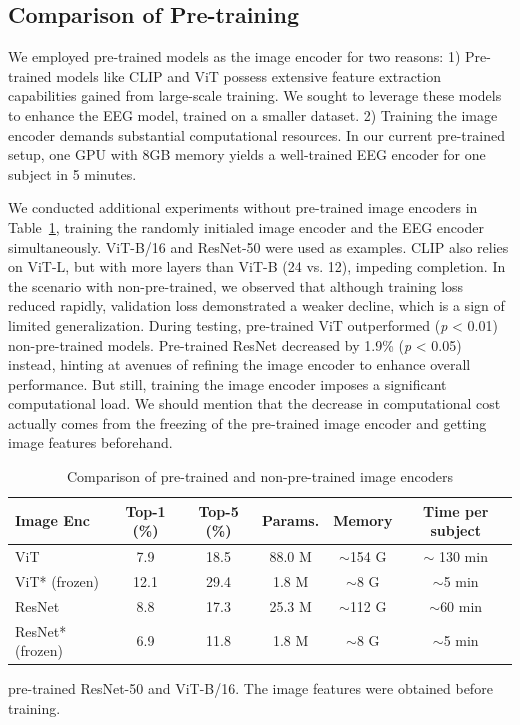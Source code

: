 \subsection{Comparison of Pre-training}
\label{sec:appendA2}
We employed pre-trained models as the image encoder for two reasons: 
1) Pre-trained models like CLIP and ViT possess extensive feature extraction capabilities gained from large-scale training. 
We sought to leverage these models to enhance the EEG model, trained on a smaller dataset. 
2) Training the image encoder demands substantial computational resources. 
In our current pre-trained setup, one GPU with 8GB memory yields a well-trained EEG encoder for one subject in 5 minutes.

We conducted additional experiments without pre-trained image encoders in Table~\ref{tab:6}, training the randomly initialed image encoder and the EEG encoder simultaneously.
ViT-B/16 and ResNet-50 were used as examples. 
CLIP also relies on ViT-L, but with more layers than ViT-B (24 vs. 12), impeding completion. 
In the scenario with non-pre-trained, we observed that although training loss reduced rapidly, validation loss demonstrated a weaker decline, which is a sign of limited generalization. 
During testing, pre-trained ViT outperformed (\textit{p} < 0.01) non-pre-trained models. 
Pre-trained ResNet decreased by 1.9\% (\textit{p} < 0.05) instead, hinting at avenues of refining the image encoder to enhance overall performance.
But still, training the image encoder imposes a significant computational load. 
We should mention that the decrease in computational cost actually comes from the freezing of the pre-trained image encoder and getting image features beforehand. 


\begin{table}[h]
  \caption{Comparison of pre-trained and non-pre-trained image encoders}
  \label{tab:6}
  \small
  \centering
  \begin{threeparttable}
\begin{tabular}{lccccc}
   \toprule
   Image Enc & Top-1 (\%) & Top-5 (\%) & Params. & Memory & Time per subject \\
   \midrule
   ViT & 7.9 & 18.5 & 88.0 M & $\sim$154 G & $\sim$ 130 min \\
   ViT* (frozen) & 12.1 & 29.4 & 1.8 M & $\sim$8 G & $\sim$5 min \\
   ResNet & 8.8 & 17.3 & 25.3 M & $\sim$112 G & $\sim$60 min \\
   ResNet* (frozen) & 6.9 & 11.8 & 1.8 M &  $\sim$8 G & $\sim$5 min \\
   \bottomrule
\end{tabular}
      \begin{tablenotes}
        \item[*]pre-trained ResNet-50 and ViT-B/16. The image features were obtained before training.  
    \end{tablenotes}
\end{threeparttable}
\end{table}


